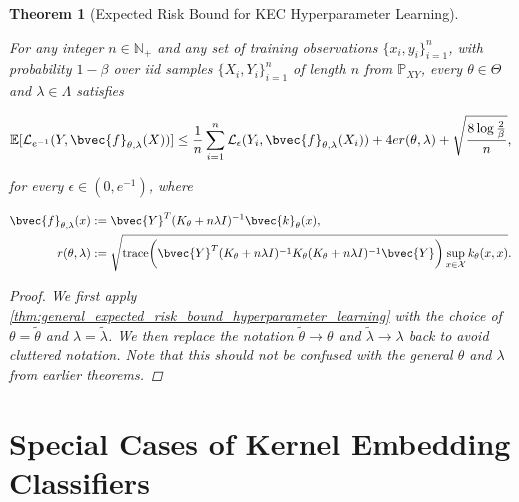 \documentclass{article}
\newtheorem{theorem}{Theorem}[section]
\begin{document}
		\begin{theorem}[Expected Risk Bound for KEC Hyperparameter Learning]
			\label{thm:expected_risk_bound_hyperparameter_learning}
			
			For any integer $n \in \mathbb{N}_{+}$ and any set of training observations $\{x_{i}, y_{i}\}_{i = 1}^{n}$, with probability $1 - \beta$ over \textit{iid} samples $\{X_{i}, Y_{i}\}_{i = 1}^{n}$ of length $n$ from $\mathbb{P}_{X Y}$, every $\theta \in \Theta$ and $\lambda \in \Lambda$ satisfies
			
			\begin{equation}
				\mathbb{E}[\mathcal{L}_{e^{-1}}(Y, \bvec{f}_{\theta, \lambda}(X))] \leq \frac{1}{n} \sum_{i = 1}^{n} \mathcal{L}_{\epsilon}(Y_{i}, \bvec{f}_{\theta, \lambda}(X_{i})) + 4 e r(\theta, \lambda) + \sqrt{\frac{8 \log{\frac{2}{\beta}}}{n}},
			\label{eq:expected_risk_bound_hyperparameter_learning}
			\end{equation}
			
			for every $\epsilon \in (0, e^{-1})$, where 
			
			\begin{equation}
				\begin{aligned}
					\bvec{f}_{\theta, \lambda}(x) &:= \bvec{Y}^{T} (K_{\theta} + n \lambda I)^{-1} \bvec{k}_{\theta}(x), \\
					r(\theta, \lambda) &:= \sqrt{\mathrm{trace}\bigg(\bvec{Y}^{T} (K_{\theta} + n \lambda I)^{-1} K_{\theta} (K_{\theta} + n \lambda I)^{-1} \bvec{Y}\bigg) \sup_{x \in \mathcal{X}} k_{\theta}(x, x)}.
				\end{aligned}
			\end{equation}
			
			\begin{proof}
				We first apply \cref{thm:general_expected_risk_bound_hyperparameter_learning} with the choice of $\theta = \tilde{\theta}$ and $\lambda = \tilde{\lambda}$. We then replace the notation $\tilde{\theta} \rightarrow \theta$ and $\tilde{\lambda} \rightarrow \lambda$ back to avoid cluttered notation. Note that this should not be confused with the general $\theta$ and $\lambda$ from earlier theorems.
			\end{proof}
		\end{theorem}
		
\newpage
\section{Special Cases of Kernel Embedding Classifiers}
\label{app:special_cases}
\end{document}
